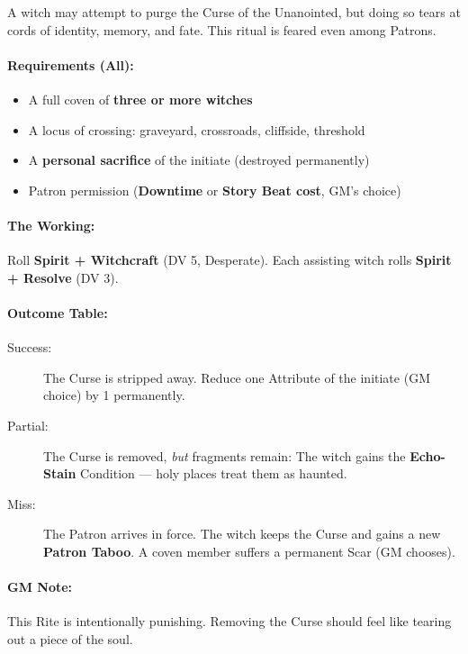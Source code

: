\documentclass[11pt]{book}
\begin{document}
\begin{tcolorbox}[colback=black!5,colframe=crimson,
title={\textbf{Grand Rite of Severance} --- Breaking the Curse of the Unanointed}]

A witch may attempt to purge the Curse of the Unanointed, but doing so tears at
cords of identity, memory, and fate. This ritual is feared even among Patrons.

\paragraph{Requirements (All):}
\begin{itemize}[leftmargin=1.5em]
    \item A full coven of \textbf{three or more witches}
    \item A locus of crossing: graveyard, crossroads, cliffside, threshold
    \item A \textbf{personal sacrifice} of the initiate (destroyed permanently)
    \item Patron permission (\textbf{Downtime} or \textbf{Story Beat cost}, GM's choice)
\end{itemize}

\paragraph{The Working:}
Roll \textbf{Spirit + Witchcraft} (DV 5, Desperate).  
Each assisting witch rolls \textbf{Spirit + Resolve} (DV 3).

\paragraph{Outcome Table:}
\begin{description}
    \item[Success:]  
    The Curse is stripped away.  
    Reduce one Attribute of the initiate (GM choice) by 1 permanently.

    \item[Partial:]  
    The Curse is removed, \emph{but} fragments remain:  
    The witch gains the \textbf{Echo-Stain} Condition --- holy places treat them as haunted.

    \item[Miss:]  
    The Patron arrives in force.  
    The witch keeps the Curse and gains a new \textbf{Patron Taboo}.  
    A coven member suffers a permanent Scar (GM chooses).
\end{description}

\paragraph{GM Note:}
This Rite is intentionally punishing.  
Removing the Curse should feel like tearing out a piece of the soul.

\end{tcolorbox}
\end{document}
